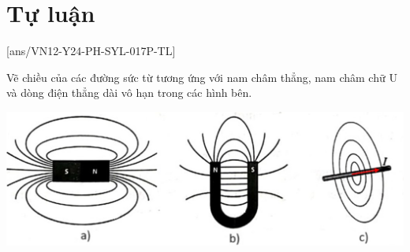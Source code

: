 \section{Tự luận}
\setcounter{ex}{0}
[ans/VN12-Y24-PH-SYL-017P-TL]
\begin{ex}
	Vẽ chiều của các đường sức từ tương ứng với nam châm thẳng, nam châm chữ U và dòng điện thẳng dài vô hạn trong các hình bên.
	\begin{center}
		\includegraphics[width=0.8\linewidth]{../figs/VN12-Y24-PH-SYL-017P-1}
	\end{center}
	\end{ex}

